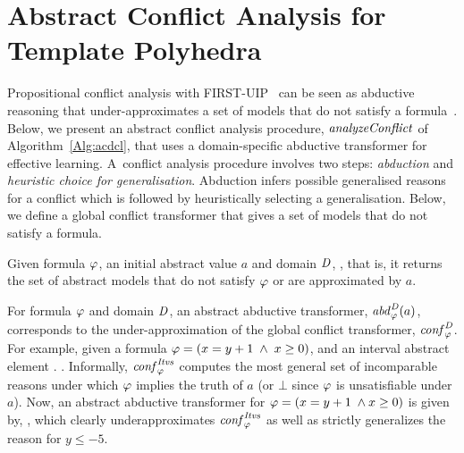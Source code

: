 \section{Abstract Conflict Analysis for Template Polyhedra}\label{sec:conflict}
%
Propositional conflict analysis with FIRST-UIP~\cite{cdcl} can be seen as
abductive reasoning that under-approximates a set of models that do not
satisfy a formula~\cite{sas12,dhk2013-popl}.  Below, we present an abstract
conflict analysis procedure, $\mathit{analyzeConflict}$ of
Algorithm~\ref{Alg:acdcl}, that uses a domain-specific abductive transformer
for effective learning.  A~conflict analysis procedure involves two steps:
{\em abduction} and {\em heuristic choice for generalisation}.  Abduction
infers possible generalised reasons for a conflict which is followed by
heuristically selecting a generalisation.  Below, we define a global 
conflict transformer that gives a set of models that do not satisfy a 
formula.  
\begin{definition}
  Given formula $\varphi$, an initial abstract value $a$ and domain 
  $\mathit{D}$, , that is, it returns the set of abstract models that do not satisfy 
  $\varphi$ or are approximated by $a$.
\end{definition}
%
For formula $\varphi$ and domain $\mathit{D}$, an abstract abductive transformer, 
$\mathit{abd}_{\varphi}^{\mathit{D}}(a)$, corresponds to the under-approximation of the 
global conflict transformer, $\mathit{conf}_{\varphi}^{\mathit{D}}$.  
%
For example, given a formula $\varphi=(x=y+1\; \wedge\; x\geq 0)$, and an interval 
abstract element .  
.
Informally, $\mathit{conf}_{\varphi}^{\mathit{Itvs}}$  computes the most general set of
incomparable reasons under which $\varphi$ implies the truth of $a$ (or $\bot$
since $\varphi$ is unsatisfiable under $a$). 
%
Now, an abstract abductive transformer for $\varphi=(x=y+1\; \wedge x \geq 0)$ 
is given by,  ,
which clearly underapproximates $\mathit{conf}_{\varphi}^{\mathit{Itvs}}$ as well as strictly
generalizes the reason for $y \leq -5$. 
%


